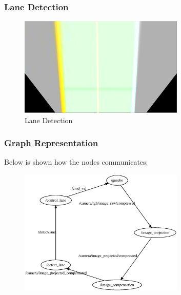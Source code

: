 \begin{frame}
	\frametitle{Lane Detection}
	\begin{figure}
		\includegraphics[width=0.7\textwidth]{figures/png/detectlane}
		\caption{Lane Detection}
	\end{figure}
\end{frame}

\begin{frame}
	\frametitle{Graph Representation}
	Below is shown how the nodes communicates:
	\begin{figure}
		\includegraphics[width=0.7\textwidth]{figures/eps/graph}
	\end{figure}
\end{frame}